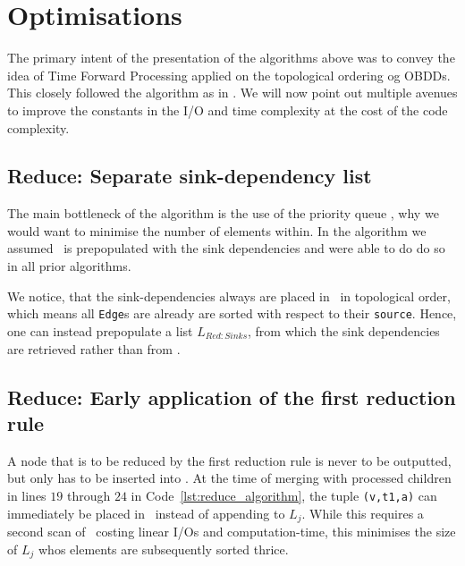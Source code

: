 \section{Optimisations} \label{sec:optimisations}
The primary intent of the presentation of the algorithms above was to convey the
idea of Time Forward Processing applied on the topological ordering og OBDDs.
This closely followed the algorithm as in \cite{Arge96}. We will now point out
multiple avenues to improve the constants in the I/O and time complexity at the
cost of the code complexity.

\subsection{Reduce: Separate sink-dependency list}
The main bottleneck of the algorithm is the use of the priority queue
\ReduceQdep, why we would want to minimise the number of elements within.
In the algorithm we assumed \ReduceQdep\ is prepopulated with the sink
dependencies and were able to do do so in all prior algorithms.

We notice, that the sink-dependencies always are placed in \ReduceQdep\ in
topological order, which means all \lstinline{Edge}s are already are sorted with
respect to their \lstinline{source}. Hence, one can instead prepopulate a list
$L_{\mathit{Red:}Sinks}$, from which the sink dependencies are retrieved rather
than from \ReduceQdep.


\subsection{Reduce: Early application of the first reduction rule}
A node that is to be reduced by the first reduction rule is never to be
outputted, but only has to be inserted into \ReduceQdep. At the time of merging
with processed children in lines $19$ through $24$ in
Code~\ref{lst:reduce_algorithm}, the tuple \lstinline{(v,t1,a)} can immediately
be placed in \ReduceQdep\ instead of appending to $L_j$. While this requires a
second scan of \ReduceLdep\ costing linear I/Os and computation-time, this
minimises the size of $L_j$ whos elements are subsequently sorted thrice.


